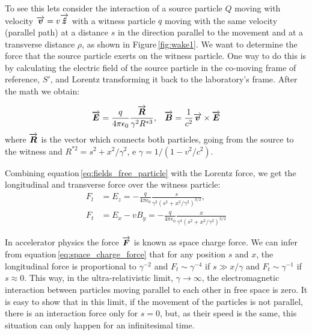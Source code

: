 \begin{apendicesenv}
    To see this lets consider the interaction of a source particle $Q$ moving with velocity $\overrightarrow{\boldsymbol{v}}=v{\overrightarrow{\boldsymbol{\hat{z}}}}$ with a witness particle $q$ moving with the same velocity (parallel path) at a distance $s$ in the direction parallel to the movement and at a transverse distance $\rho$, as shown in Figure\,\ref{fig:wake1}. We want to determine the force that the source particle exerts on the witness particle. One way to do this is by calculating the electric field of the source particle in the co-moving frame of reference, $S'$, and Lorentz transforming it back to the laboratory's frame. After the math we obtain:

    \begin{align}\label{eq:fields_free_particle}
    	\overrightarrow{\boldsymbol{E}} = \frac{q}{4\pi\epsilon_0}\frac{\overrightarrow{\boldsymbol{R}}}{\gamma^2 R^{*3}}, & & \overrightarrow{\boldsymbol{B}} = \frac{1}{c^2}\overrightarrow{\boldsymbol{v}} \times \overrightarrow{\boldsymbol{E}}
    \end{align}
    where $\overrightarrow{\boldsymbol{R}}$ is the vector which connects both particles, going from the source to the witness and  $R^{*2} = s^2 + x^2/\gamma^2$, e $\gamma = 1/(1-v^2/c^2)$.

    Combining equation\,\ref{eq:fields_free_particle} with the Lorentz force, we get the longitudinal and transverse force over the witness particle:
    \begin{align}\label{eq:space_charge_force}
    	F_l &= E_z = -\frac{q}{4\pi\epsilon_0}\frac{s}{\gamma^2\left(s^2+x^2/\gamma^2\right)^{3/2}}, \\
    	F_t &= E_x - vB_y = -\frac{q}{4\pi\epsilon_0}\frac{x}{\gamma^4\left(s^2+x^2/\gamma^2\right)^{3/2}}
    \end{align}

    In accelerator physics the force $\overrightarrow{\boldsymbol{F}}$ is known as space charge force. We can infer from equation\,\ref{eq:space_charge_force} that for any position $s$ and $x$, the longitudinal force is proportional to $\gamma^{-2}$ and $F_t \sim \gamma^{-4}$ if $s \gg x/\gamma$ and  $F_t \sim \gamma^{-1}$ if $s \approx 0$. This way, in the ultra-relativistic limit, $\gamma \to \infty$, the electromagnetic interaction between particles moving parallel to each other in free space is zero. It is easy to show that in this limit, if the movement of the particles is not parallel, there is an interaction force only for $s=0$, but, as their speed is the same, this situation can only happen for an infinitesimal time.


\end{apendicesenv}
